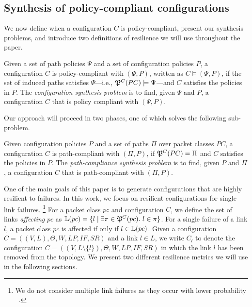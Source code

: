 \subsection{Synthesis of policy-compliant configurations}
We now define when a configuration $C$ is policy-compliant, present our synthesis problems, and introduce 
two definitions of resilience we will use throughout the paper.
\begin{definition} \label{def:policycompliance}
	Given a set of path policies $\Psi$ and a set of configuration policies $P$,
	a configuration $C$ is policy-compliant with $(\Psi,P)$,  
	written as $C \models (\Psi,P)$, if the set of
	induced paths satisfies $\Psi$---i.e., $\mathfrak{P}^C(PC) \models \Psi$---and $C$ satisfies the policies in $P$.
	The \emph{configuration synthesis problem} is to find, given $\Psi$ and $P$,
a configuration $C$ that is policy compliant with $(\Psi,P)$.
\end{definition}

Our approach will proceed in two phases,
one of which solves the following sub-problem.  
\begin{definition} \label{def:pathcompliance}
Given configuration policies $P$
and a set of paths $\Pi$ over packet classes $PC$,
	a configuration $C$ is path-compliant with 
	$(\Pi,P)$,
	if $\mathfrak{P}^C(PC)=\Pi$ and $C$ satisfies the policies in $P$.
	The \emph{path-compliance synthesis problem} is to find, given $P$ and $\Pi$,
a configuration $C$ that is path-compliant with $(\Pi,P)$.
\end{definition}

One of the main goals of this paper is to 
generate configurations that are highly resilient to failures. In this
work, we focus on resilient configurations for single link failures.
\footnote{ 
We do not consider multiple link failures as they occur with lower probability
~\cite{datacenterfailures}.}
For a packet class $pc$ and configuration $C$, we define 
the set of links \emph{affecting} $pc$ as 
$\mathbb{L}(pc) = \{l \mid \exists \pi \in \mathfrak{P}^C(pc).~l \in \pi  \}$.
For a single failure of a link $l$, a packet class $pc$ is affected 
if only if $l \in \mathbb{L}(pc)$. 
Given a configuration
$C=((V,L), \Theta,W,LP,IF,SR)$ and a link $l\in L$,
we write $C_l$ 
to denote the configuration
$C=((V,L\setminus\{l\}), \Theta,W,LP,IF,SR)$
in which the link $l$ has been removed from the topology.
We present two different resilience metrics 
we will use in the following sections. 

